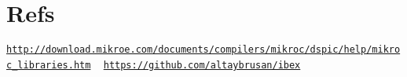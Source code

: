 \hypertarget{index_refs}{}\section{Refs}\label{index_refs}
\href{http://download.mikroe.com/documents/compilers/mikroc/dspic/help/mikroc_libraries.htm}{\tt http\+://download.\+mikroe.\+com/documents/compilers/mikroc/dspic/help/mikroc\+\_\+libraries.\+htm} ~\newline
 \href{https://github.com/altaybrusan/ibex}{\tt https\+://github.\+com/altaybrusan/ibex} 